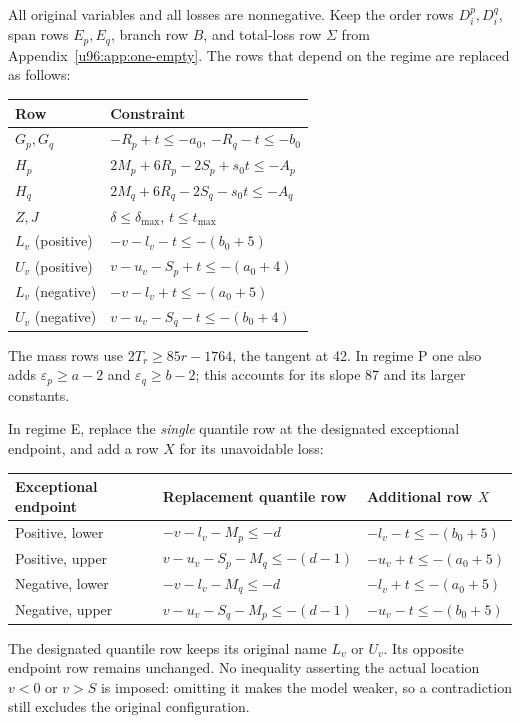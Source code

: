 \documentclass[11pt,a4paper]{article}
\theoremstyle{remark}
\begin{document}
All original variables and all losses are nonnegative. Keep the order
rows $D_i^p,D_i^q$, span rows $E_p,E_q$, branch row $B$, and total-loss
row $\Sigma$ from Appendix~\ref{u96:app:one-empty}. The rows that depend on
the regime are replaced as follows:
\begin{center}\small
\begin{tabular}{ll}
\toprule
Row&Constraint\\
\midrule
$G_p,G_q$&$-R_p+t\leq-a_0$, $-R_q-t\leq-b_0$\\
$H_p$&$2M_p+6R_p-2S_p+s_0t\leq-A_p$\\
$H_q$&$2M_q+6R_q-2S_q-s_0t\leq-A_q$\\
$Z,J$&$\delta\leq\delta_{\max}$, $t\leq t_{\max}$\\
$L_v$ (positive)&$-v-l_v-t\leq-(b_0+5)$\\
$U_v$ (positive)&$v-u_v-S_p+t\leq-(a_0+4)$\\
$L_v$ (negative)&$-v-l_v+t\leq-(a_0+5)$\\
$U_v$ (negative)&$v-u_v-S_q-t\leq-(b_0+4)$\\
\bottomrule
\end{tabular}
\end{center}
The mass rows use $2T_r\geq85r-1764$, the tangent at 42. In regime P
one also adds $\varepsilon_p\geq a-2$ and $\varepsilon_q\geq b-2$;
this accounts for its slope 87 and its larger constants.

In regime E, replace the \emph{single} quantile row at the designated
exceptional endpoint, and add a row $X$ for its unavoidable loss:
\begin{center}\small
\begin{tabular}{lll}
\toprule
Exceptional endpoint&Replacement quantile row&Additional row $X$\\
\midrule
Positive, lower&$-v-l_v-M_p\leq-d$&$-l_v-t\leq-(b_0+5)$\\
Positive, upper&$v-u_v-S_p-M_q\leq-(d-1)$&$-u_v+t\leq-(a_0+5)$\\
Negative, lower&$-v-l_v-M_q\leq-d$&$-l_v+t\leq-(a_0+5)$\\
Negative, upper&$v-u_v-S_q-M_p\leq-(d-1)$&$-u_v-t\leq-(b_0+5)$\\
\bottomrule
\end{tabular}
\end{center}
The designated quantile row keeps its original name $L_v$ or $U_v$.
Its opposite endpoint row remains unchanged. No inequality asserting the
actual location $v<0$ or $v>S$ is imposed: omitting it makes the model
weaker, so a contradiction still excludes the original configuration.
\end{document}
